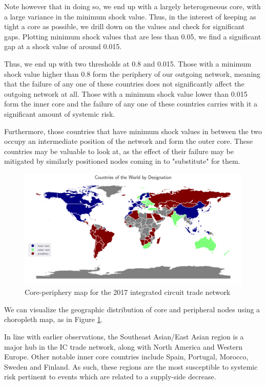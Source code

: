 \documentclass[12pt,letterpaper]{report}
\begin{document}
				Note however that in doing so, we end up with a largely heterogeneous core, with a large variance in the minimum shock value. Thus, in the interest of keeping as tight a core as possible, we drill down on the values and check for significant gaps. Plotting minimum shock values that are less than 0.05, we find a significant gap at a shock value of around 0.015.
				
				Thus, we end up with two thresholds at 0.8 and 0.015. Those with a minimum shock value higher than 0.8 form the periphery of our outgoing network, meaning that the failure of any one of these countries does not significantly affect the outgoing network at all. Those with a minimum shock value lower than 0.015 form the inner core and the failure of any one of these countries carries with it a significant amount of systemic risk.
				
				Furthermore, those countries that have minimum shock values in between the two occupy an intermediate position of the network and form the outer core. These countries may be valuable to look at, as the effect of their failure may be mitigated by similarly positioned nodes coming in to "substitute" for them.
								 
				\begin{figure}[!h]
					\centering
					\includegraphics[width=\textwidth]{Fig519-CorePeripheryMap.png}
					\caption{Core-periphery map for the 2017 integrated circuit trade network}\label{fig:519CorePeripheryMap}
				\end{figure}
				 
				We can visualize the geographic distribution of core and peripheral nodes using a choropleth map, as in Figure \ref{fig:519CorePeripheryMap}.
				
				In line with earlier observations, the Southeast Asian/East Asian region is a major hub in the IC trade network, along with North America and Western Europe. Other notable inner core countries include Spain, Portugal, Morocco, Sweden and Finland. As such, these regions are the most susceptible to systemic risk pertinent to events which are related to a supply-side decrease.
				
\end{document}
